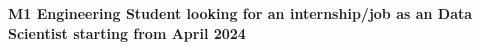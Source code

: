 \vspace{0.5cm}
\newcommand{\jobTitle}{an Data Scientist }
\begin{center}
    {\Large {\color{black}\textbf{M1 Engineering Student looking for an internship/job as \jobTitle starting from April 2024}}}
\end{center}

